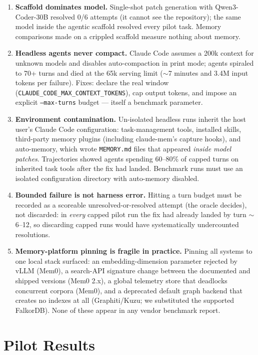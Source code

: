 \documentclass[11pt]{article}
\begin{document}
\begin{enumerate}
  \item \textbf{Scaffold dominates model.} Single-shot patch generation with Qwen3-Coder-30B resolved 0/6 attempts (it cannot see the repository); the same model inside the agentic scaffold resolved every pilot task. Memory comparisons made on a crippled scaffold measure nothing about memory.
  \item \textbf{Headless agents never compact.} Claude Code assumes a 200k context for unknown models and disables auto-compaction in print mode; agents spiraled to 70+ turns and died at the 65k serving limit ($\sim$7 minutes and 3.4M input tokens per failure). Fixes: declare the real window (\texttt{CLAUDE\_CODE\_MAX\_CONTEXT\_TOKENS}), cap output tokens, and impose an explicit \texttt{--max-turns} budget --- itself a benchmark parameter.
  \item \textbf{Environment contamination.} Un-isolated headless runs inherit the host user's Claude Code configuration: task-management tools, installed skills, third-party memory plugins (including claude-mem's capture hooks), and auto-memory, which wrote \texttt{MEMORY.md} files that appeared \emph{inside model patches}. Trajectories showed agents spending 60--80\% of capped turns on inherited task tools after the fix had landed. Benchmark runs must use an isolated configuration directory with auto-memory disabled.
  \item \textbf{Bounded failure is not harness error.} Hitting a turn budget must be recorded as a scoreable unresolved-or-resolved attempt (the oracle decides), not discarded: in \emph{every} capped pilot run the fix had already landed by turn $\sim$6--12, so discarding capped runs would have systematically undercounted resolutions.
  \item \textbf{Memory-platform pinning is fragile in practice.} Pinning all systems to one local stack surfaced: an embedding-dimension parameter rejected by vLLM (Mem0), a search-API signature change between the documented and shipped versions (Mem0 2.x), a global telemetry store that deadlocks concurrent corpora (Mem0), and a deprecated default graph backend that creates no indexes at all (Graphiti/Kuzu; we substituted the supported FalkorDB). None of these appear in any vendor benchmark report.
\end{enumerate}

\section{Pilot Results}
\label{sec:results}
\end{document}
